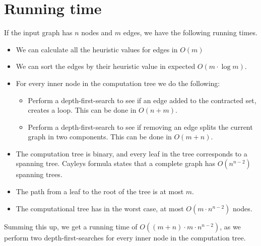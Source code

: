 \section{Running time}
If the input graph has $n$ nodes and $m$ edges, we have the following running times.

\begin{itemize}
\item We can calculate all the heuristic values for edges in $O(m)$

\item We can sort the edges by their heuristic value in expected $O(m\cdot \log m)$.

\item For every inner node in the computation tree we do the following:
\begin{itemize}
\item Perform a depth-first-search to see if an edge added to the contracted set, creates a loop. This can be done in $O(n+m)$.

\item Perform a depth-first-search to see if removing an edge splits the current graph in two components. This can be done in $O(m+n)$.
\end{itemize}

\item The computation tree is binary, and every leaf in the tree corresponds to a spanning tree. Cayleys formula states that a complete graph has $O(n^{n-2})$ spanning trees.

\item The path from a leaf to the root of the tree is at most $m$.

\item The computational tree has in the worst case, at most $O(m\cdot n^{n-2})$ nodes.
\end{itemize}

Summing this up, we get a running time of $O((m+n)\cdot m\cdot n^{n-2})$, as we perform two depth-first-searches for every inner node in the computation tree.